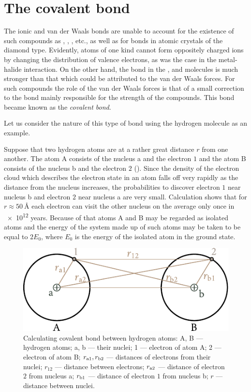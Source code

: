 \section{The covalent bond}\label{sec:1_3}

The ionic and van der Waals bonds are unable to account for the existence of such compounds as , , , etc., as well as for bonds in atomic crystals of the diamond type. Evidently, atoms of one kind cannot form oppositely charged ions by changing the distribution of valence electrons, as was the case in the metal-halide interaction. On the other hand, the bond in the ,  and  molecules is much stronger than that which could be attributed to the van der Waals forces. For such compounds the role of the van der Waals forces is that of a small correction to the bond mainly responsible for the strength of the compounds. This bond became known as the \textit{covalent bond}.

Let us consider the nature of this type of bond using the hydrogen molecule as an example.

Suppose that two hydrogen atoms are at a rather great distance $r$ from one another. The atom A consists of the nucleus a and the electron $1$ and the atom B consists of the nucleus b and the electron $2$ (). Since the density of the electron cloud which describes the electron state in an atom falls off very rapidly as the distance from the nucleus increases, the probabilities to discover electron $1$ near nucleus b and electron $2$ near nucleus a are very small. Calculation shows that for $r\approx\SI{50}{\angstrom}$ each electron can visit the other nucleus on the average only once in \num{e12} years. Because of that atoms A and B may be regarded as isolated atoms and the energy of the system made up of such atoms may be taken to be equal to $2E_0$, where $E_0$ is the energy of the isolated atom in the ground state.

\begin{figure}[t]
	\begin{center}
		\includegraphics[scale=1]{figures/ch_01/fig_1_5.pdf}
		\caption[]{Calculating covalent bond between hydrogen atoms: A, B --- hydrogen atoms; a, b --- their nuclei; 1 --- electron of atom A; 2 --- electron of atom B; $r_{\text{a$1$}}, r_{\text{b$2$}}$ --- distances of electrons from their nuclei; $r_{12}$ --- distance between electrons; $r_{\text{a$2$}}$ --- distance of electron $2$ from nucleus a; $r_{\text{b$1$}}$ --- distance of electron $1$ from nucleus b; $r$ --- distance between nuclei.}
		\label{fig:1_5}
	\end{center}
	\vspace{-0.7cm}
\end{figure}

